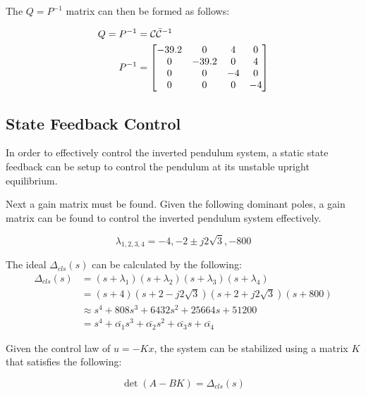 \documentclass[]{article}
\newcommand{\ctrbl}{\mathcal{C}}
\begin{document}
			The $Q = P^{-1}$ matrix can then be formed as follows:
			
			\begin{equation}
				\begin{aligned}
					Q = P^{-1}	&= \ctrbl \bar{\ctrbl}^{-1}\\
						P^{-1}	&= \mqty[	-39.2	&0		&4	&0\\
											0		&-39.2	&0	&4\\
											0		&0		&-4	&0\\
											0		&0		&0	&-4]
				\end{aligned}
			\end{equation}
			
			
	\newpage
	\subsection{State Feedback Control}
		\label{sec:PSD_pblm1}
		In order to effectively control the inverted pendulum system, a static state feedback can be setup to control the pendulum at its unstable upright equilibrium.
	
		Next a gain matrix must be found. Given the following dominant poles, a gain matrix can be found to control the inverted pendulum system effectively.
		
		\begin{equation}
			\lambda_{1,2,3,4} = {-4, -2 \pm j 2 \sqrt{3}, -800}
			\label{eq:Desiered_poles}
		\end{equation}
	
		The ideal $\Delta_{cls} (s)$ can be calculated by the following:
		\begin{equation}
			\begin{aligned}
				\Delta_{cls} (s) &= (s + \lambda_1) (s + \lambda_2) (s + \lambda_3)(s+\lambda_4)\\
								&= (s + 4) (s + 2 -j 2 \sqrt{3}) (s+2 + j 2 \sqrt{3})(s+800)\\
								&\approx s^4 + 808 s^3 + 6432 s^2 + 25664 s + 51200\\
								&= s^4 + \bar{\alpha_1} s^3 + \bar{\alpha_2} s^2 + \bar{\alpha_3} s + \bar{\alpha_4}
			\end{aligned} \label{eq:ideal_char_poly}
		\end{equation}
		
		Given the control law of $u = - K x$, the system can be stabilized using a matrix $K$ that satisfies the following:
		
		\begin{equation}
			\det(A - B K) = \Delta_{cls} (s)
		\end{equation}
		
\end{document}
